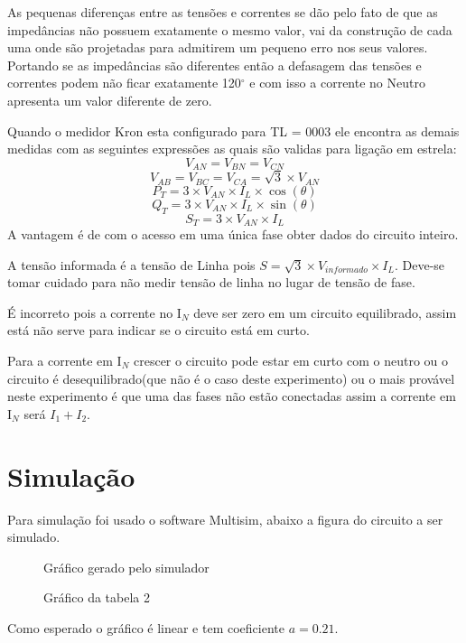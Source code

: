 \documentclass[a4paper, 12pt]{article}
\begin{document}
    As pequenas diferenças entre as tensões e correntes se dão pelo fato de que as impedâncias não possuem exatamente o mesmo valor, vai da construção de cada uma onde são projetadas para admitirem um pequeno erro nos seus valores. Portando se as impedâncias são diferentes então a defasagem das tensões e correntes podem não ficar exatamente 120\(^\circ\) e com isso a corrente no Neutro apresenta um valor diferente de zero.

    Quando o medidor Kron esta configurado para TL = 0003 ele encontra as
    demais medidas com as seguintes expressões as quais são validas para ligação em estrela:
    \[V_{AN} = V_{BN} = V_{CN}\]
    \[V_{AB} = V_{BC} = V_{CA} = \sqrt{3}\times V_{AN}\]
    \[P_T = 3\times V_{AN} \times I_L\times\cos(\theta)\]
    \[Q_T = 3\times V_{AN} \times I_L\times\sin(\theta)\]
    \[S_T = 3\times V_{AN} \times I_L\]
    A vantagem é de com o acesso em uma única fase obter dados do circuito inteiro.
    
    A tensão informada é a tensão de Linha pois \(S = \sqrt{3}\times V_{informado}\times I_L\).
    Deve-se tomar cuidado para não medir tensão de linha no lugar de tensão de fase.
    
    É incorreto pois a corrente no I$_N$ deve ser zero em um circuito equilibrado, assim está não serve para indicar se o circuito está em curto.
    
    Para a corrente em I$_N$ crescer o circuito pode estar em curto com o neutro ou o circuito é desequilibrado(que não é o caso deste experimento) ou o mais provável neste experimento é que uma das fases não estão conectadas assim a corrente em I$_N$ será \(I_1 + I_2\).
\newpage
\section{Simulação}
    \justifying
    Para simulação foi usado o  software Multisim, abaixo a figura do circuito a ser simulado.
  

    \begin{figure}[h]
            \centering %
            \caption{Gráfico gerado pelo simulador}
            \label{figura:grafico simulacao}
    \end{figure} 
 
  



    \begin{figure}[H]
            \centering %
            \caption{Gráfico da tabela 2}
            \label{figura:grafico pontos simulacao}
    \end{figure} 
    Como esperado o gráfico é linear e tem coeficiente \(a = 0.21 \).
        
\end{document}
